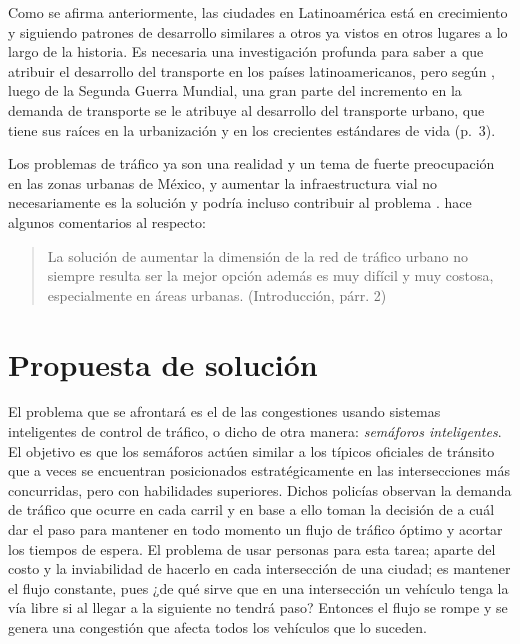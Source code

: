 Como se afirma anteriormente, las ciudades en Latinoamérica está en
crecimiento y siguiendo patrones de desarrollo similares a otros ya
vistos en otros lugares a lo largo de la historia. Es necesaria una
investigación profunda para saber a que atribuir el desarrollo del
transporte en los países latinoamericanos, pero según
\textcite{Patriksson2012}, luego de la Segunda Guerra Mundial, una gran
parte del incremento en la demanda de transporte se le atribuye al
desarrollo del transporte urbano, que tiene sus raíces en la
urbanización y en los crecientes estándares de vida (p.~3).

Los problemas de tráfico ya son una realidad y un tema de fuerte
preocupación en las zonas urbanas de México, y aumentar la
infraestructura vial no necesariamente es la solución y podría incluso
contribuir al problema \parencite[124-126]{Galindo2006}.
\textcite{JoelTrejo2006} hace algunos comentarios al respecto:

\begin{quote}
La solución de aumentar la dimensión de la red de tráfico urbano no
siempre resulta ser la mejor opción además es muy difícil y muy costosa,
especialmente en áreas urbanas. (Introducción, párr. 2)
\end{quote}

\hypertarget{propuesta-de-soluciuxf3n}{%
\section{Propuesta de solución}\label{propuesta-de-soluciuxf3n}}

El problema que se afrontará es el de las congestiones usando sistemas
inteligentes de control de tráfico, o dicho de otra manera:
\emph{semáforos inteligentes}. El objetivo es que los semáforos actúen
similar a los típicos oficiales de tránsito que a veces se encuentran
posicionados estratégicamente en las intersecciones más concurridas,
pero con habilidades superiores. Dichos policías observan la demanda de
tráfico que ocurre en cada carril y en base a ello toman la decisión de
a cuál dar el paso para mantener en todo momento un flujo de tráfico
óptimo y acortar los tiempos de espera. El problema de usar personas
para esta tarea; aparte del costo y la inviabilidad de hacerlo en cada
intersección de una ciudad; es mantener el flujo constante, pues ¿de qué
sirve que en una intersección un vehículo tenga la vía libre si al
llegar a la siguiente no tendrá paso? Entonces el flujo se rompe y se
genera una congestión que afecta todos los vehículos que lo suceden.

